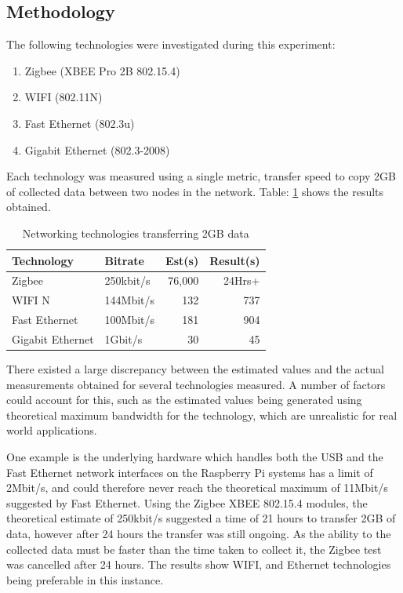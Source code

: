 \subsection*{Methodology}
The following technologies were investigated during this experiment:

\begin{enumerate}
	\item Zigbee (XBEE Pro 2B 802.15.4)
	\item WIFI (802.11N)
	\item Fast Ethernet (802.3u)
	\item Gigabit Ethernet (802.3-2008)
\end{enumerate}

Each technology was measured using a single metric, transfer speed to copy 2GB of collected data between two nodes in the network. Table: \ref{tab:network_technologies_transfer_time} shows the results obtained. 

%
\begin{table}
	\centering
	\begin{tabular}{p{3cm} l r r }
		\toprule
		Technology & Bitrate & Est(s) & Result(s)\\ \midrule
		Zigbee & 250kbit/s &  76,000 & 24Hrs+ \\
		WIFI N & 144Mbit/s & 132 & 737\\
		Fast Ethernet & 100Mbit/s & 181 & 904 \\
		Gigabit Ethernet & 1Gbit/s & 30 & 45 \\
		\bottomrule
	\end{tabular}
	\caption{Networking technologies transferring 2GB data}
	\label{tab:network_technologies_transfer_time}
\end{table}
%

There existed a large discrepancy between the estimated values and the actual measurements obtained for several technologies measured. A number of factors could account for this, such as the estimated values being generated using theoretical maximum bandwidth for the technology, which are unrealistic for real world applications.

One example is the underlying hardware which handles both the USB and the Fast Ethernet network interfaces on the Raspberry Pi systems has a limit of 2Mbit/s, and could therefore never reach the theoretical maximum of 11Mbit/s suggested by Fast Ethernet. Using the Zigbee XBEE 802.15.4 modules, the theoretical estimate of 250kbit/s suggested a time of 21 hours to transfer 2GB of data, however after 24 hours the transfer was still ongoing. As the ability to the collected data must be faster than the time taken to collect it, the Zigbee test was cancelled after 24 hours. The results show WIFI, and Ethernet technologies being preferable in this instance.
